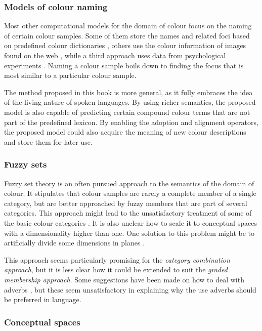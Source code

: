 \subsubsection*{Models of colour naming}

Most other computational models for the domain of colour focus on the
naming of certain colour samples. Some of them store the names and
related foci based on predefined colour dictionaries
\citep{mojsilovic05computational}, others use the colour information
of images found on the web \citep{vandewijer07learning}, while a
third approach uses data from psychological experiments
\citep{menegaz07discrete}. Naming a colour sample boils down to
finding the focus that is most similar to a particular colour sample.

The method proposed in this book is more general, as it fully
embraces the idea of the living nature of spoken languages. By using
richer semantics, the proposed model is also capable of predicting
certain compound colour terms that are not part of the predefined
lexicon. By enabling the adoption and alignment operators, the
proposed model could also acquire the meaning of new colour
descriptions and store them for later use.

\subsubsection*{Fuzzy sets}

Fuzzy set theory is an often pursued approach to the semantics of the
domain of colour. It stipulates that colour samples are rarely a
complete member of a single category, but are better approached by
fuzzy members that are part of several categories. This approach might
lead to the unsatisfactory treatment of some of the basic colour
categories \citep{kay78linguistic}. It is also unclear how to scale it
to conceptual spaces with a dimensionality higher than one. One
solution to this problem might be to artificially divide some
dimensions in planes \citep{benavente08parametric}.

This approach seems particularly promising for the \emph{category
  combination approach}, but it is less clear how it could be extended
to suit the \emph{graded membership approach}. Some suggestions have
been made on how to deal with adverbs \citep{hersh76fuzzy}, but these
seem unsatisfactory in explaining why the use adverbs should be
preferred in language.

\subsubsection*{Conceptual spaces}

